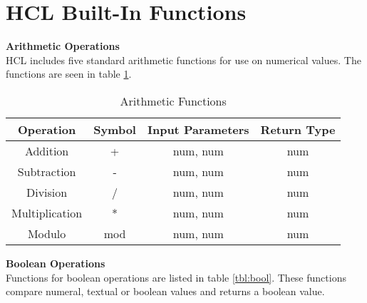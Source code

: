 \section{HCL Built-In Functions}
\label{builtinAppend}
\textbf{Arithmetic Operations}\\
HCL includes five standard arithmetic functions for use on numerical values.
The functions are seen in table \ref{tbl:arith}.

\begin{table}[h]
	\centering
	\caption{Arithmetic Functions}
	\label{tbl:arith}
	\begin{tabular}{|c|c|c|c|}
		\hline
		\textbf{Operation}      & \textbf{Symbol} & \textbf{Input Parameters} & \textbf{Return Type} \\ \hline
		Addition       & +      & num, num         & num         \\ \hline
		Subtraction    & -      & num, num         & num         \\ \hline
		Division       & /      & num, num         & num         \\ \hline
		Multiplication & *      & num, num         & num         \\ \hline
		Modulo         & mod    & num, num         & num         \\ \hline
	\end{tabular}
\end{table}

\textbf{Boolean Operations}\\
Functions for boolean operations are listed in table \ref{tbl:bool}.
These functions compare numeral, textual or boolean values and returns a boolean value.

